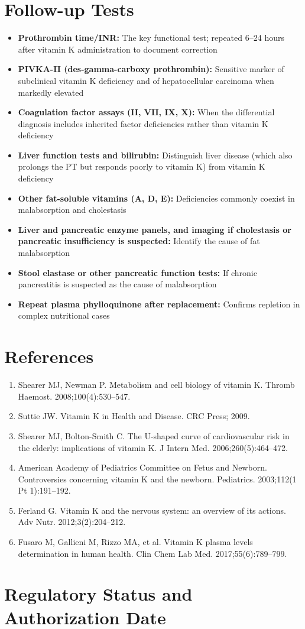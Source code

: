 \section*{Follow-up Tests}
\begin{itemize}
  \item \textbf{Prothrombin time/INR:} The key functional test; repeated 6--24 hours after vitamin K administration to document correction
  \item \textbf{PIVKA-II (des-gamma-carboxy prothrombin):} Sensitive marker of subclinical vitamin K deficiency and of hepatocellular carcinoma when markedly elevated
  \item \textbf{Coagulation factor assays (II, VII, IX, X):} When the differential diagnosis includes inherited factor deficiencies rather than vitamin K deficiency
  \item \textbf{Liver function tests and bilirubin:} Distinguish liver disease (which also prolongs the PT but responds poorly to vitamin K) from vitamin K deficiency
  \item \textbf{Other fat-soluble vitamins (A, D, E):} Deficiencies commonly coexist in malabsorption and cholestasis
  \item \textbf{Liver and pancreatic enzyme panels, and imaging if cholestasis or pancreatic insufficiency is suspected:} Identify the cause of fat malabsorption
  \item \textbf{Stool elastase or other pancreatic function tests:} If chronic pancreatitis is suspected as the cause of malabsorption
  \item \textbf{Repeat plasma phylloquinone after replacement:} Confirms repletion in complex nutritional cases
\end{itemize}

\section*{References}
\begin{enumerate}
  \item Shearer MJ, Newman P. Metabolism and cell biology of vitamin K. Thromb Haemost. 2008;100(4):530--547.
  \item Suttie JW. Vitamin K in Health and Disease. CRC Press; 2009.
  \item Shearer MJ, Bolton-Smith C. The U-shaped curve of cardiovascular risk in the elderly: implications of vitamin K. J Intern Med. 2006;260(5):464--472.
  \item American Academy of Pediatrics Committee on Fetus and Newborn. Controversies concerning vitamin K and the newborn. Pediatrics. 2003;112(1 Pt 1):191--192.
  \item Ferland G. Vitamin K and the nervous system: an overview of its actions. Adv Nutr. 2012;3(2):204--212.
  \item Fusaro M, Gallieni M, Rizzo MA, et al. Vitamin K plasma levels determination in human health. Clin Chem Lab Med. 2017;55(6):789--799.
\end{enumerate}

\clearpage
\section*{Regulatory Status and Authorization Date}

\clearpage
